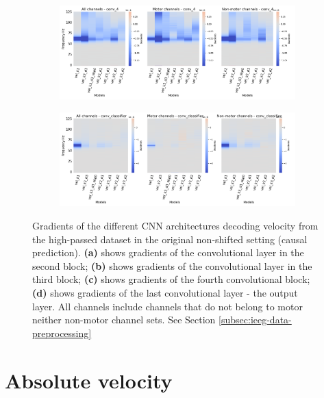 \begin{figure}[!htbp]\ContinuedFloat

\begin{subfigure}[c]{\textwidth}
   \includegraphics[width=0.9\linewidth]{img/appendix/A/conv-4/hp-m/vel-model_gradients_all_kinds}
   \caption{}
   \label{fig:vel-hp-grads-conv-4}
\end{subfigure}

\begin{subfigure}[d]{\textwidth}
   \includegraphics[width=0.9\linewidth]{img/appendix/A/conv-classifier/hp-m/vel-model_gradients_all_kinds}
   \caption{}
   \label{fig:vel-hp-grads-conv-classifier}
\end{subfigure}

\caption[]{Gradients of the different CNN architectures decoding velocity from the high-passed dataset in the original non-shifted setting (causal prediction). \textbf{(a)} shows gradients of the convolutional layer in the second block; \textbf{(b)} shows gradients of the convolutional layer in the third block; \textbf{(c)} shows gradients of the fourth convolutional block; \textbf{(d)} shows gradients of the last convolutional layer - the output layer. All channels include channels that do not belong to motor neither non-motor channel sets. See Section \ref{subsec:ieeg-data-preprocessing}}
\label{fig:vel-hp-grads}
\end{figure}
\clearpage

\section*{Absolute velocity}\label{sec:absolute-velocity-appendixA}

